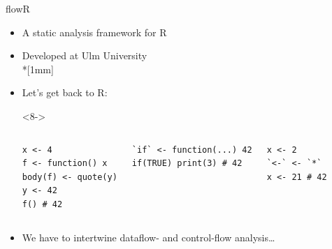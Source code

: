 \savebox\PartyPingu{\tikz{\pingu[wings wave,eyes wink,tie=purple]}}
\begin{frame}[fragile]{flowR}
   \begin{itemize}
      \itemsep6pt
      \item<2-> A static analysis framework for R
      \item<3-> Developed at Ulm University \\*[1mm]
      \item<7-> Let's get back to R:
\begin{uncoverenv}<8->
   \begin{columns}[onlytextwidth,c]
\begin{verbatim}
x <- 4
f <- function() x
body(f) <- quote(y)
y <- 42
f() # 42
\end{verbatim}
\color{black}\vspace*{-\baselineskip}%
\begin{verbatim}
`if` <- function(...) 42
if(TRUE) print(3) # 42
\end{verbatim}
\color{black}\vspace*{-\baselineskip}%
\begin{verbatim}
x <- 2
`<-` <- `*`
x <- 21 # 42
\end{verbatim}
\end{columns}
\end{uncoverenv}
\item<9-> We have to intertwine dataflow- and control-flow analysis\ldots
\end{itemize}
\end{frame}
\def\SwitchTo#1#2{#1}
\def\GrayBack{\fill[white,opacity=.7] (current bounding box.south west) rectangle (current bounding box.north east);}
